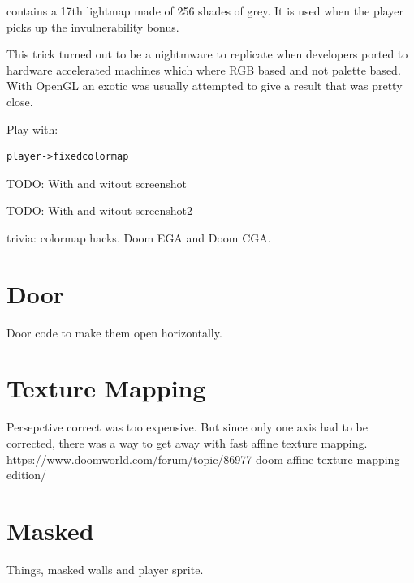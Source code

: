  contains a 17th lightmap made of 256 shades of grey. It is used when the player picks up the invulnerability bonus.\
\par 
{}
\par
This trick turned out to be a nightmware to replicate when developers ported \doom to hardware accelerated machines which where RGB based and not palette based. With OpenGL an exotic  was usually attempted to give a result that was pretty close.\\
\par
{}
\par
Play with:
\begin{verbatim}
player->fixedcolormap
\end{verbatim}


TODO: With and witout screenshot\\
\par
TODO: With and witout screenshot2\\
\par
trivia: colormap hacks. Doom EGA and Doom CGA.\\





\section{Door}
Door code to make them open horizontally.
\section{Texture Mapping}
Persepctive correct was too expensive. But since only one axis had to be corrected, there was a way to get away with fast affine texture mapping.\\
https://www.doomworld.com/forum/topic/86977-doom-affine-texture-mapping-edition/\\
\par



\section{Masked}
Things, masked walls and player sprite.\\

\null\newpage %
\par

